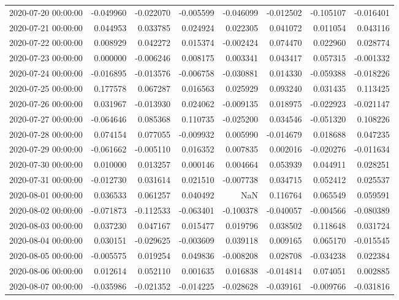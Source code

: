 \begin{tabular}{lrrrrrrr}
2020-07-20 00:00:00 & -0.049960 & -0.022070 & -0.005599 & -0.046099 & -0.012502 & -0.105107 & -0.016401 \\
2020-07-21 00:00:00 & 0.044953 & 0.033785 & 0.024924 & 0.022305 & 0.041072 & 0.011054 & 0.043116 \\
2020-07-22 00:00:00 & 0.008929 & 0.042272 & 0.015374 & -0.002424 & 0.074470 & 0.022960 & 0.028774 \\
2020-07-23 00:00:00 & 0.000000 & -0.006246 & 0.008175 & 0.003341 & 0.043417 & 0.057315 & -0.001332 \\
2020-07-24 00:00:00 & -0.016895 & -0.013576 & -0.006758 & -0.030881 & 0.014330 & -0.059388 & -0.018226 \\
2020-07-25 00:00:00 & 0.177578 & 0.067287 & 0.016563 & 0.025929 & 0.093240 & 0.031435 & 0.113425 \\
2020-07-26 00:00:00 & 0.031967 & -0.013930 & 0.024062 & -0.009135 & 0.018975 & -0.022923 & -0.021147 \\
2020-07-27 00:00:00 & -0.064646 & 0.085368 & 0.110735 & -0.025200 & 0.034546 & -0.051320 & 0.108226 \\
2020-07-28 00:00:00 & 0.074154 & 0.077055 & -0.009932 & 0.005990 & -0.014679 & 0.018688 & 0.047235 \\
2020-07-29 00:00:00 & -0.061662 & -0.005110 & 0.016352 & 0.007835 & 0.002016 & -0.020276 & -0.011634 \\
2020-07-30 00:00:00 & 0.010000 & 0.013257 & 0.000146 & 0.004664 & 0.053939 & 0.044911 & 0.028251 \\
2020-07-31 00:00:00 & -0.012730 & 0.031614 & 0.021510 & -0.007738 & 0.034715 & 0.052412 & 0.025537 \\
2020-08-01 00:00:00 & 0.036533 & 0.061257 & 0.040492 & NaN & 0.116764 & 0.065549 & 0.059591 \\
2020-08-02 00:00:00 & -0.071873 & -0.112533 & -0.063401 & -0.100378 & -0.040057 & -0.004566 & -0.080389 \\
2020-08-03 00:00:00 & 0.037230 & 0.047167 & 0.015477 & 0.019796 & 0.038502 & 0.118648 & 0.031724 \\
2020-08-04 00:00:00 & 0.030151 & -0.029625 & -0.003609 & 0.039118 & 0.009165 & 0.065170 & -0.015545 \\
2020-08-05 00:00:00 & -0.005575 & 0.019254 & 0.049836 & -0.008208 & 0.028708 & -0.034238 & 0.022384 \\
2020-08-06 00:00:00 & 0.012614 & 0.052110 & 0.001635 & 0.016838 & -0.014814 & 0.074051 & 0.002885 \\
2020-08-07 00:00:00 & -0.035986 & -0.021352 & -0.014225 & -0.028628 & -0.039161 & -0.009766 & -0.031816 \\

\end{tabular}
